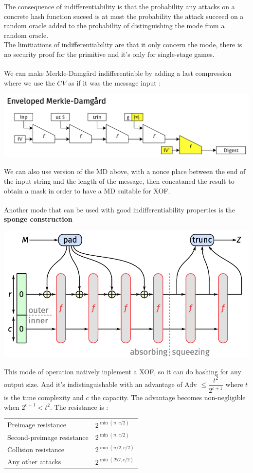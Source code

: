 \documentclass[11pt,a4paper]{report}
\begin{document}
The consequence of indifferentiability is that the probability any attacks on a concrete hash function suceed is at most the probability the attack succeed on a random oracle added to the probability of distinguishing  the mode from a random oracle.\\
The limitiations of indifferentiability are that it only concern the mode, there is no security proof for the primitive and it's only for single-stage games.\\
\\
We can make Merkle-Damgård indifferentiable by adding a last compression where we use the $CV$ as if it was the message input :
\begin{center}
\includegraphics[scale=0.4]{img/img26.png}
\end{center}
We can also use version of the MD above, with a nonce place between the end of the input string and the length of the message, then concataned the result to obtain a mask in order to have a MD suitable for XOF.\\
\\
Another mode that can be used with good indifferentiability properties is the \textbf{sponge construction}
\begin{center}
\includegraphics[scale=0.5]{img/img27.png}
\end{center}
This mode of operation natively inplement a XOF, so it can do hashing for any output size. And it's indistinguishable with an advantage of Adv $\leq \dfrac{t^2}{2^{c+1}}$ where $t$ is the time complexity and $c$ the capacity. The advantage becomes non-negligible when $2^{c+1} < t^2$.
The resistance is : 
\begin{center}
\begin{tabular}{|l|l|}
\hline
Preimage resistance & $2^{\min (n,c/2)}$\\
Second-preimage resistance & $2^{\min (n,c/2)}$\\
Collision resistance & $2^{\min (n/2,c/2)}$\\
Any other attacks & $2^{\min (\mathcal{RO},c/2)}$\\
\hline
\end{tabular}
\end{center}
\end{document}
